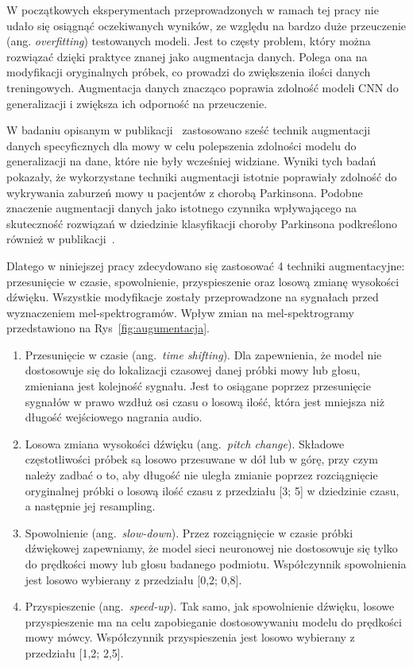W początkowych eksperymentach przeprowadzonych w ramach tej pracy nie udało się osiągnąć oczekiwanych wyników, ze względu na bardzo duże przeuczenie (ang. \emph{overfitting}) testowanych modeli.
Jest to częsty problem, który można rozwiązać dzięki praktyce znanej jako augmentacja danych.
Polega ona na modyfikacji oryginalnych próbek, co prowadzi do zwiększenia ilości danych treningowych.
Augmentacja danych znacząco poprawia zdolność modeli CNN do generalizacji i zwiększa ich odporność na przeuczenie.

W badaniu opisanym w publikacji~\cite{augmentation} zastosowano sześć technik augmentacji danych specyficznych dla mowy w celu polepszenia zdolności modelu do generalizacji na dane, które nie były wcześniej widziane.
Wyniki tych badań pokazały, że wykorzystane techniki augmentacji  istotnie poprawiały zdolność do wykrywania zaburzeń mowy u pacjentów z chorobą Parkinsona.
Podobne znaczenie augmentacji danych jako istotnego czynnika wpływającego na skuteczność rozwiązań w dziedzinie klasyfikacji choroby Parkinsona podkreślono również w publikacji~\cite{Wodzinski}.

Dlatego w niniejszej pracy zdecydowano się zastosować 4 techniki augmentacyjne: przesunięcie w czasie, spowolnienie, przyspieszenie oraz losową zmianę wysokości dźwięku.
Wszystkie modyfikacje zostały przeprowadzone na sygnałach przed wyznaczeniem mel-spektrogramów.
Wpływ zmian na mel-spektrogramy przedstawiono na Rys~\ref{fig:augumentacja}.


\begin{enumerate}[label={\alph*)}]
	\item Przesunięcie w czasie (ang.~\emph{time shifting}). Dla zapewnienia, że model nie dostosowuje się do lokalizacji czasowej danej próbki mowy lub głosu, zmieniana jest kolejność sygnału.
Jest to osiągane poprzez przesunięcie sygnałów w prawo wzdłuż osi czasu o losową ilość, która jest mniejsza niż długość wejściowego nagrania audio.
    \item Losowa zmiana wysokości dźwięku (ang.~\emph{pitch change}). Składowe częstotliwości próbek są losowo przesuwane w dół lub w górę, przy czym należy zadbać o to, aby długość nie uległa zmianie poprzez rozciągnięcie oryginalnej próbki o losową ilość czasu z przedziału [3; 5] w dziedzinie czasu, a następnie jej resampling.
    \item Spowolnienie (ang.~\emph{slow-down}).
Przez rozciągnięcie w czasie próbki dźwiękowej zapewniamy, że model sieci neuronowej nie dostosowuje się tylko do prędkości mowy lub głosu badanego podmiotu.
Współczynnik spowolnienia jest losowo wybierany z przedziału [0,2; 0,8].
    \item Przyspieszenie (ang.~\emph{speed-up}). Tak samo, jak spowolnienie dźwięku, losowe przyspieszenie ma na celu zapobieganie dostosowywaniu modelu do prędkości mowy mówcy.
Współczynnik przyspieszenia jest losowo wybierany z przedziału [1,2; 2,5].
\end{enumerate}

